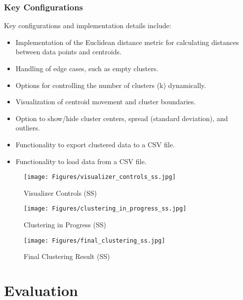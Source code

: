 \documentclass[12pt]{report}
\begin{document}
\subsection{Key Configurations}
Key configurations and implementation details include:
\begin{itemize}
    \item Implementation of the Euclidean distance metric for calculating distances between data points and centroids.
    \item Handling of edge cases, such as empty clusters.
    \item Options for controlling the number of clusters (k) dynamically.
    \item Visualization of centroid movement and cluster boundaries.
    \item Option to show/hide cluster centers, spread (standard deviation), and outliers.
    \item Functionality to export clustered data to a CSV file.
    \item Functionality to load data from a CSV file.
\end{itemize}
\begin{figure}[h]
    \centering
    \texttt{[image: Figures/visualizer\_controls\_ss.jpg]}
    \caption{Visualizer Controls (SS)}
\end{figure}
\begin{figure}[h]
    \centering
    \texttt{[image: Figures/clustering\_in\_progress\_ss.jpg]}
    \caption{Clustering in Progress (SS)}
\end{figure}
\begin{figure}[h]
    \centering
    \texttt{[image: Figures/final\_clustering\_ss.jpg]}
    \caption{Final Clustering Result (SS)}
\end{figure}
\newpage
\chapter{Evaluation}
\end{document}
